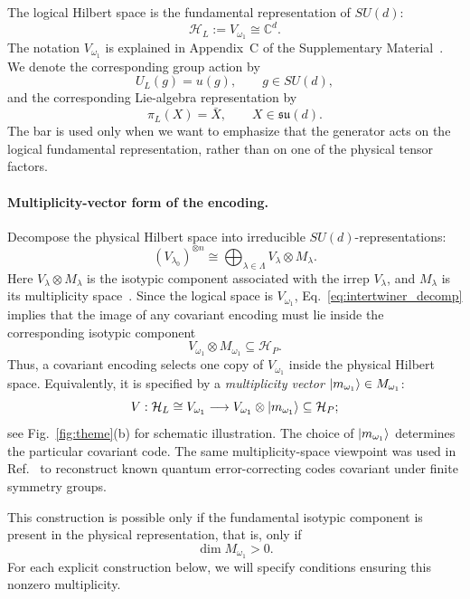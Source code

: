 \documentclass[10pt,twocolumn,superscriptaddress,aps,amsmath,amssymb,citeautoscript,floatfix,prx,longbibliography]{revtex4-2}
\newcounter{alg}
\theoremstyle{plain}
\theoremstyle{plain}
\theoremstyle{plain}
\theoremstyle{plain}
\theoremstyle{plain}
\theoremstyle{plain}
\begin{document}
The logical Hilbert space is the fundamental representation of $SU(d)$:
\begin{equation}\label{eq:log_space_rep}
\mathcal H_L
:=
V_{\omega_1}
\cong
\mathbb C^d .
\end{equation}
The notation $V_{\omega_1}$ is explained in Appendix~C of the Supplementary Material~\cite{SuppMat}. We denote the corresponding group action by
$$
U_L(g)
=
u(g),
\qquad
g\in SU(d),
$$
and the corresponding Lie-algebra representation by
$$
\pi_L(X)
=
\bar X,
\qquad
X\in\mathfrak{su}(d).
$$
The bar is used only when we want to emphasize that the generator acts on the logical fundamental representation, rather than on one of the physical tensor factors.

\paragraph{Multiplicity-vector form of the encoding.}

Decompose the physical Hilbert space into irreducible $SU(d)$-representations:
\begin{equation}\label{eq:isotipic_decomp}
(V_{\lambda_0})^{\otimes n}
\cong
\bigoplus_{\lambda\in\Lambda}
V_\lambda\otimes M_\lambda .
\end{equation}
Here $V_\lambda\otimes M_\lambda$ is the isotypic component associated with the irrep $V_\lambda$, and $M_\lambda$ is its multiplicity space~\cite{Kong2022}. Since the logical space is $V_{\omega_1}$, Eq.~\eqref{eq:intertwiner_decomp} implies that the image of any covariant encoding must lie inside the corresponding isotypic component
$$
V_{\omega_1}\otimes M_{\omega_1}
\subseteq
\mathcal H_P .
$$
Thus, a covariant encoding selects one copy of $V_{\omega_1}$ inside the physical Hilbert space. Equivalently, it is specified by a \textit{multiplicity vector} $\ket{m_{\omega_1}}\in M_{\omega_1}$:
\begin{equation}\label{eq:mult_vec_enc}
V:
\mathcal H_L
\cong
V_{\omega_1}
\longrightarrow
V_{\omega_1}\otimes\ket{m_{\omega_1}}
\subseteq
\mathcal H_P;
\end{equation}
see Fig.~\ref{fig:theme}(b) for schematic illustration. The choice of $\ket{m_{\omega_1}}$ determines the particular covariant code. The same multiplicity-space viewpoint was used in Ref.~\cite{Denys2024} to reconstruct known quantum error-correcting codes covariant under finite symmetry groups.

This construction is possible only if the fundamental isotypic component is present in the physical representation, that is, only if
$$
\dim M_{\omega_1}>0 .
$$
For each explicit construction below, we will specify conditions ensuring this nonzero multiplicity.
\end{document}
